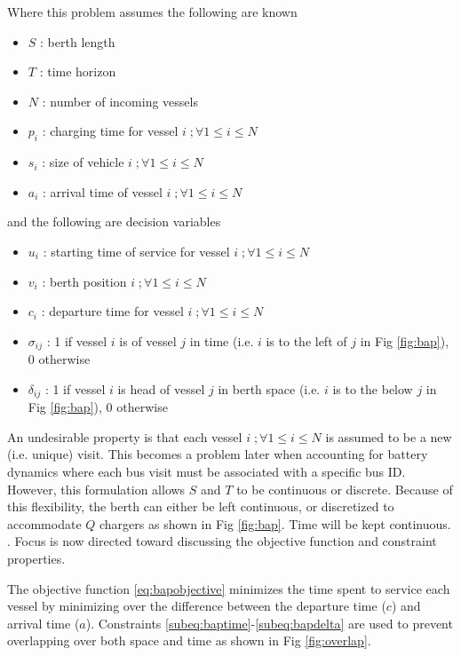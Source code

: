 \documentclass[letterpaper, 10pt, conference]{IEEEtran}
\begin{document}
Where this problem assumes the following are known

\begin{itemize}
	\item \(S\)   : berth length
	\item \(T\)   : time horizon
	\item \(N\)   : number of incoming vessels
	\item \(p_i\) : charging time for vessel \(i\;; \forall 1 \leq i \leq N\)
	\item \(s_i\) : size of vehicle \(i\;; \forall 1 \leq i \leq N\)
	\item \(a_i\) : arrival time of vessel \(i\;; \forall 1 \leq i \leq N\)
\end{itemize}

and the following are decision variables

\begin{itemize}
    \item \(u_i\)         : starting time of service for vessel \(i\;; \forall 1 \leq i \leq N\)
    \item \(v_i\)         : berth position \(i\;; \forall 1 \leq i \leq N\)
    \item \(c_i\)         : departure time for vessel \(i\;; \forall 1 \leq i \leq N\)
    \item \(\sigma_{ij}\) : 1 if vessel \(i\) is of vessel \(j\) in time (i.e. \(i\) is to the left of \(j\) in Fig \ref{fig:bap}), 0 otherwise
    \item \(\delta_{ij}\) : 1 if vessel \(i\) is head of vessel \(j\) in berth space (i.e. \(i\) is to the below \(j\) in Fig \ref{fig:bap}), 0 otherwise
\end{itemize}

An undesirable property is that each vessel \(i\;; \forall 1 \leq i \leq N\) is assumed to be a new (i.e. unique) visit. This becomes a problem later when accounting for battery dynamics where each bus visit must be associated with a specific bus ID. However, this formulation allows \(S\) and \(T\) to be continuous or discrete. Because of this flexibility, the berth can either be left continuous, or discretized to accommodate \(Q\) chargers as shown in Fig \ref{fig:bap}. Time will be kept continuous. \cite{Buhrkal2010}. Focus is now directed toward discussing the objective function and constraint properties.

The objective function \eqref{eq:bapobjective} minimizes the time spent to service each vessel by minimizing over the difference between the departure time (\(c\)) and arrival time (\(a\)). Constraints \ref{subeq:baptime}-\ref{subeq:bapdelta} are used to prevent overlapping over both space and time as shown in Fig \ref{fig:overlap}.
\end{document}

